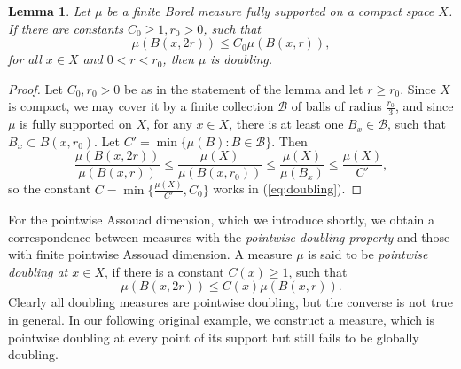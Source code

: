 \documentclass{PRM}
\theoremstyle{plain}
\newtheorem{lemma}[thm]{Lemma}
\theoremstyle{definition}
\theoremstyle{remark}
\begin{document}
\begin{lemma}\label{lemma:doubling_small_r}
Let $\mu$ be a finite Borel measure fully supported on a compact space $X$. If there are constants $C_0\geq 1,r_0>0$, such that
\begin{equation*}
    \mu(B(x,2r))\leq C_0\mu(B(x,r)),
\end{equation*}
for all $x\in X$ and $0<r<r_0$, then $\mu$ is doubling.
\end{lemma}
\begin{proof}
Let $C_0,r_0>0$ be as in the statement of the lemma and let $r\geq r_0$. Since $X$ is compact, we may cover it by a finite collection $\mathcal{B}$ of balls of radius $\frac{r_0}{3}$, and since $\mu$ is fully supported on $X$, for any $x\in X$, there is at least one $B_x\in\mathcal{B}$, such that $B_x\subset B(x,r_0)$. Let $C'=\min\{\mu(B)\colon B\in\mathcal{B}\}$. Then
\begin{equation*}
    \frac{\mu(B(x,2r))}{\mu(B(x,r))}\leq\frac{\mu(X)}{\mu(B(x,r_0))}\leq \frac{\mu(X)}{\mu(B_x)}\leq \frac{\mu(X)}{C'},
\end{equation*}
so the constant $C=\min\{\frac{\mu(X)}{C'},C_0\}$ works in (\ref{eq:doubling}).
\end{proof}

For the pointwise Assouad dimension, which we introduce shortly, we obtain a correspondence between measures with the \emph{pointwise doubling property} and those with finite pointwise Assouad dimension. A measure $\mu$ is said to be \emph{pointwise doubling at $x\in X$}, if there is a constant $C(x)\geq 1$, such that
\begin{equation*}
    \mu(B(x,2r))\leq C(x)\mu(B(x,r)).
\end{equation*}
Clearly all doubling measures are pointwise doubling, but the converse is not true in general. In our following original example, we construct a measure, which is pointwise doubling at every point of its support but still fails to be globally doubling.
\end{document}
